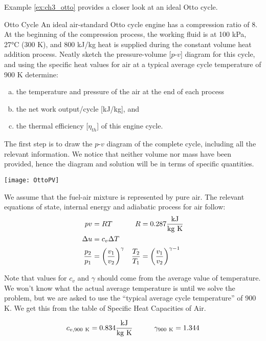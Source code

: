 Example \ref{ex:ch3_otto} provides a closer look at an ideal Otto cycle.
\newpage
\begin{example}[label=ex:ch3_otto]{Otto Cycle}
  An ideal air-standard Otto cycle engine has a compression ratio of 8. At the beginning of the compression process, the working fluid is at 100 kPa, 27°C (300 K), and 800 kJ/kg heat is supplied during the constant volume heat addition process. Neatly sketch the pressure-volume [$p$-$v$] diagram for this cycle, and using the specific heat values for air at a typical average cycle temperature of 900 K determine:
\begin{enumerate}[a)]
\item the temperature and pressure of the air at the end of each process
\item the net work output/cycle [kJ/kg], and
\item the thermal efficiency [$\eta_{th}$] of this engine cycle.
\end{enumerate}

The first step is to draw the $p$-$v$ diagram of the complete cycle, including all the relevant information. We notice that neither volume nor mass have been provided, hence the diagram and solution will be in terms of specific quantities.

\begin{center}
\texttt{[image: OttoPV]}
\end{center}

We assume that the fuel-air mixture is represented by pure air. The relevant equations of state, internal energy and adiabatic process for air follow:
\begin{align*}
  pv&=RT & R &= 0.287 \frac{\rm kJ}{\rm kg\ K}\\
  \Delta u &= c_v \Delta T \\
  \frac{p_2}{p_1} &= \left(\frac{v_1}{v_2}\right)^{\gamma} & \frac{T_2}{T_1} &= \left(\frac{v_1}{v_2}\right)^{\gamma -1}
\end{align*}

Note that values for $c_v$ and $\gamma$ should come from the average value of temperature.  We won't know what the actual average temperature is until we solve the problem, but we are asked to use the ``typical average cycle temperature'' of 900 K.  We get this from the table of Specific Heat Capacities of Air.

\begin{equation*}
  c_{v,900\rm\ K} = 0.834 \frac{\rm kJ}{\rm kg\ K} \quad\quad\quad \gamma_{900\rm\ K} = 1.344
\end{equation*}


\end{example}

